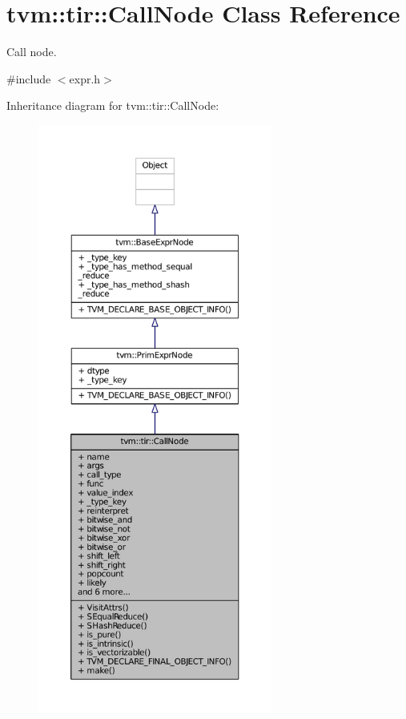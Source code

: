 \hypertarget{classtvm_1_1tir_1_1CallNode}{}\section{tvm\+:\+:tir\+:\+:Call\+Node Class Reference}
\label{classtvm_1_1tir_1_1CallNode}


Call node.  




{\ttfamily \#include $<$expr.\+h$>$}



Inheritance diagram for tvm\+:\+:tir\+:\+:Call\+Node\+:
\nopagebreak
\begin{figure}[H]
\begin{center}
\leavevmode
\includegraphics[height=550pt]{classtvm_1_1tir_1_1CallNode__inherit__graph}
\end{center}
\end{figure}


